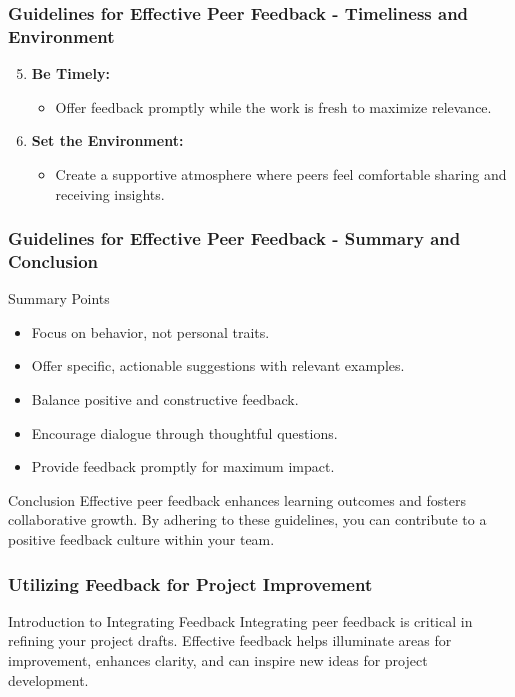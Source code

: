 \documentclass[aspectratio=169]{beamer}
\begin{document}
\begin{frame}[fragile]
    \frametitle{Guidelines for Effective Peer Feedback - Timeliness and Environment}
    \begin{enumerate}
        \setcounter{enumi}{4}
        \item \textbf{Be Timely:}
        \begin{itemize}
            \item Offer feedback promptly while the work is fresh to maximize relevance.
        \end{itemize}
        
        \item \textbf{Set the Environment:}
        \begin{itemize}
            \item Create a supportive atmosphere where peers feel comfortable sharing and receiving insights.
        \end{itemize}
    \end{enumerate}
\end{frame}

\begin{frame}[fragile]
    \frametitle{Guidelines for Effective Peer Feedback - Summary and Conclusion}
    \begin{block}{Summary Points}
        \begin{itemize}
            \item Focus on behavior, not personal traits.
            \item Offer specific, actionable suggestions with relevant examples.
            \item Balance positive and constructive feedback.
            \item Encourage dialogue through thoughtful questions.
            \item Provide feedback promptly for maximum impact.
        \end{itemize}
    \end{block}
    
    \begin{block}{Conclusion}
        Effective peer feedback enhances learning outcomes and fosters collaborative growth. By adhering to these guidelines, you can contribute to a positive feedback culture within your team.
    \end{block}
\end{frame}

\begin{frame}[fragile]
    \frametitle{Utilizing Feedback for Project Improvement}
    \begin{block}{Introduction to Integrating Feedback}
        Integrating peer feedback is critical in refining your project drafts. Effective feedback helps illuminate areas for improvement, enhances clarity, and can inspire new ideas for project development.
    \end{block}
\end{frame}
\end{document}
